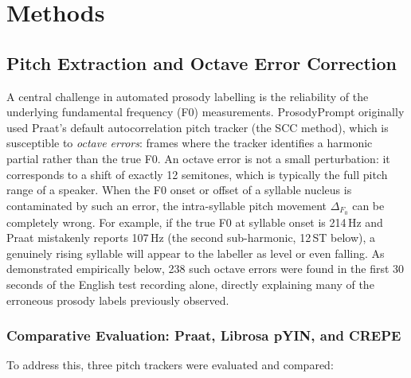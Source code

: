 
\chapter{Methods}
\label{methods}

\section{Pitch Extraction and Octave Error Correction}
\label{sec:pitch_extraction}

A central challenge in automated prosody labelling is the reliability of the
underlying fundamental frequency (F0) measurements. ProsodyPrompt originally used
Praat's default autocorrelation pitch tracker (the SCC method), which is
susceptible to \emph{octave errors}: frames where the tracker identifies a
harmonic partial rather than the true F0. An octave error is not a small
perturbation: it corresponds to a shift of exactly 12 semitones, which is
typically the full pitch range of a speaker. When the F0 onset or offset of a
syllable nucleus is contaminated by such an error, the intra-syllable pitch
movement $\Delta_{F_0}$ can be completely wrong. For example, if the true F0 at
syllable onset is 214\,Hz and Praat mistakenly reports 107\,Hz (the second
sub-harmonic, 12\,ST below), a genuinely rising syllable will appear to the
labeller as level or even falling. As demonstrated empirically below, 238 such
octave errors were found in the first 30 seconds of the English test recording
alone, directly explaining many of the erroneous prosody labels previously
observed.

\subsection{Comparative Evaluation: Praat, Librosa pYIN, and CREPE}
\label{sec:tracker_comparison}

To address this, three pitch trackers were evaluated and compared:

